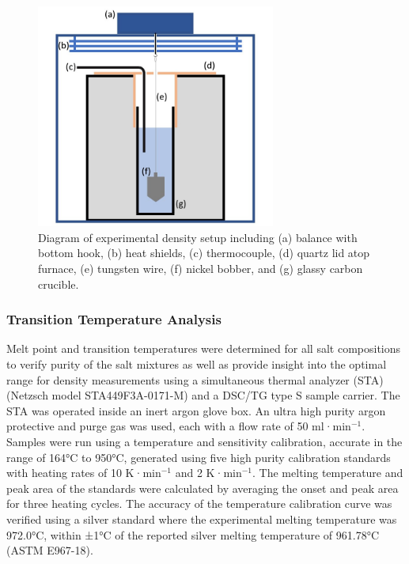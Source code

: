 \documentclass[review]{elsarticle}
\begin{document}
\begin{figure}[h]
 \centering
 \includegraphics[width=0.7\textwidth]{images/Density_exp_setup.jpg} 
 \caption{Diagram of experimental density setup including (a) balance with bottom hook, (b) heat shields, (c) thermocouple, (d) quartz lid atop furnace, (e) tungsten wire, (f) nickel bobber, and (g) glassy carbon crucible.}
 \label{fig:dens}
\end{figure} 

\subsubsection{Transition Temperature Analysis}

Melt point and transition temperatures were determined for all salt compositions to verify purity of the salt mixtures as well as provide insight into the optimal range for density measurements using a simultaneous thermal analyzer (STA) (Netzsch model STA449F3A-0171-M) and a DSC/TG type S sample carrier. The STA was operated inside an inert argon glove box. An ultra high purity argon protective and purge gas was used, each with a flow rate of 50 ml·min$^{-1}$. Samples were run using a temperature and sensitivity calibration, accurate in the range of 164°C to 950°C, generated using five high purity calibration standards with heating rates of 10 K·min$^{-1}$ and 2 K·min$^{-1}$. The melting temperature and peak area of the standards were calculated by averaging the onset and peak area for three heating cycles. The accuracy of the temperature calibration curve was verified using a silver standard where the experimental melting temperature was 972.0°C, within ±1°C of the reported silver melting temperature of 961.78°C (ASTM E967-18). 
\end{document}
